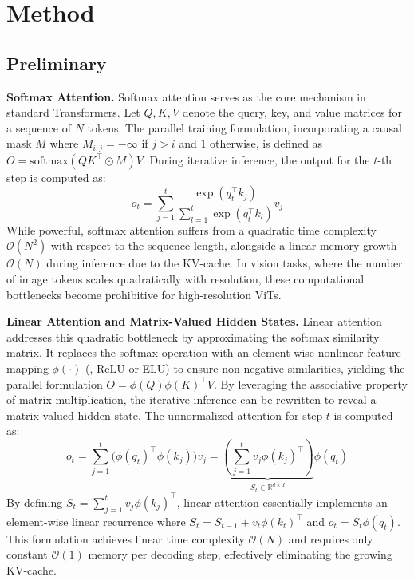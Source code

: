 \section{Method}
\subsection{Preliminary}

\textbf{Softmax Attention.} Softmax attention serves as the core mechanism in standard Transformers. Let $Q, K, V$ denote the query, key, and value matrices for a sequence of $N$ tokens. The parallel training formulation, incorporating a causal mask $M$ where $M_{i,j} = -\infty$ if $j > i$ and $1$ otherwise, is defined as $O = \text{softmax}(QK^\top \odot M)V$. During iterative inference, the output for the $t$-th step is computed as:
\begin{equation}
	o_t = \sum_{j=1}^t \frac{\exp(q_t^\top k_j)}{\sum_{l=1}^t \exp(q_t^\top k_l)} v_j
\end{equation}
While powerful, softmax attention suffers from a quadratic time complexity $\mathcal{O}(N^2)$ with respect to the sequence length, alongside a linear memory growth $\mathcal{O}(N)$ during inference due to the KV-cache. In vision tasks, where the number of image tokens scales quadratically with resolution, these computational bottlenecks become prohibitive for high-resolution ViTs.

\textbf{Linear Attention and Matrix-Valued Hidden States.} Linear attention addresses this quadratic bottleneck by approximating the softmax similarity matrix. It replaces the softmax operation with an element-wise nonlinear feature mapping $\phi(\cdot)$ (\eg, ReLU or ELU) to ensure non-negative similarities, yielding the parallel formulation $O = \phi(Q)\phi(K)^\top V$. By leveraging the associative property of matrix multiplication, the iterative inference can be rewritten to reveal a matrix-valued hidden state. The unnormalized attention for step $t$ is computed as:
\begin{equation}
	o_t = \sum_{j=1}^t \big(\phi(q_t)^\top \phi(k_j)\big)v_j = \underbrace{\left( \sum_{j=1}^t v_j \phi(k_j)^\top \right)}_{S_t \in \mathbb{R}^{d \times d}} \phi(q_t)
\end{equation}
By defining $S_t = \sum_{j=1}^t v_j \phi(k_j)^\top$, linear attention essentially implements an element-wise linear recurrence where $S_t = S_{t-1} + v_t\phi(k_t)^\top$ and $o_t = S_t\phi(q_t)$. This formulation achieves linear time complexity $\mathcal{O}(N)$ and requires only constant $\mathcal{O}(1)$ memory per decoding step, effectively eliminating the growing KV-cache.

